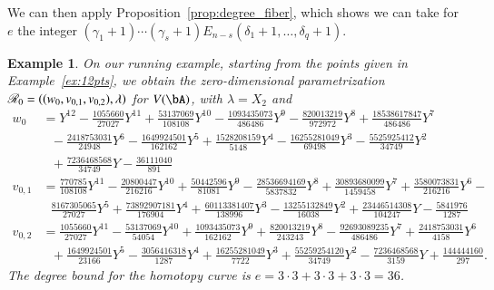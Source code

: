 \documentclass[amsthm]{elsart}
\newtheorem{example}[definition]{Example}
\begin{document}
We can then apply Proposition~\ref{prop:degree_fiber}, which shows we
can take for $e$ the integer $(\gamma_1+1)\cdots(\gamma_s+1)
E_{n-s}(\delta_1+1, \ldots, \delta_q+1)$.  

\begin{example}\label{ex:12param}
On our running example, starting from the points given in 
Example~\ref{ex:12pts},
we obtain the zero-dimensional parametrization
$\mathscr{R}_0=((w_0,v_{0,1},v_{0,2}),\lambda)$
for $V(\bA)$, with $\lambda = X_2$ and
{\footnotesize  \begin{align*}
w_0 &=Y^{12} - \frac{1055660}{27027}Y^{11} + \frac{53137069}{108108}Y^{10} - \frac{1093435073}{486486}Y^9 - 
    \frac{820013219}{972972}Y^8 + \frac{18538617847}{486486}Y^7 \\
  &~~~- \frac{2418753031}{24948}Y^6 - 
    \frac{1649924501}{162162}Y^5 + \frac{1528208159}{5148}Y^4 - \frac{16255281049}{69498}Y^3 - 
    \frac{5525925412}{34749}Y^2\\
  &~~~ + \frac{7236468568}{34749}Y - \frac{36111040}{891}\\[1mm]
v_{0,1}&=
\frac{770785}{108108}Y^{11} - \frac{20800447}{216216}Y^{10} + \frac{50442596}{81081}Y^9 - 
    \frac{28536694169}{5837832}Y^8 + \frac{30893680099}{1459458}Y^7 + \frac{3580073831}{216216}Y^6 -  \\
  &~~~
    \frac{8167305065}{27027}Y^5 + \frac{73892907181}{176904}Y^4 + \frac{60113381407}{138996}Y^3 - 
    \frac{13255132849}{16038}Y^2 + \frac{23446514308}{104247}Y  - \frac{5841976}{1287}\\[1mm]
v_{0,2}&=\frac{1055660}{27027}Y^{11} - \frac{53137069}{54054}Y^{10} + \frac{1093435073}{162162}Y^9 + 
    \frac{820013219}{243243}Y^8 - \frac{92693089235}{486486}Y^7+ \frac{2418753031}{4158}Y^6 \\ &~~~ + 
    \frac{1649924501}{23166}Y^5 - \frac{3056416318}{1287}Y^4 + \frac{16255281049}{7722}Y^3 + 
    \frac{55259254120}{34749}Y^2 -\frac{7236468568}{3159}Y + \frac{144444160}{297}.
  \end{align*}}
The degree bound for the homotopy curve is $e=3\cdot3 + 3 \cdot 3 + 3\cdot 3 = 36$.
\end{example}
\end{document}
